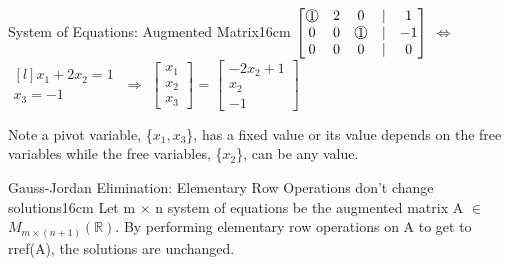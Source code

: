 \begin{definition}{System of Equations: Augmented Matrix}{16cm}
        \hspace{0.5cm}
        $\begin{bmatrix}
            \circnum{1} & 2 & 0 & | & 1 \\
            0 & 0 & \circnum{1} & | & -1 \\
            0 & 0 & 0 & | & 0
        \end{bmatrix}$
        \hspace{0.5cm}
        $\Leftrightarrow$
        \hspace{0.5cm}
        $\begin{matrix*}[l]
            x_1 + 2x_2 = 1 \\
            x_3 = -1
        \end{matrix*}$
        \hspace{0.5cm}
        $\Rightarrow$
        \hspace{0.5cm}
        $\begin{bmatrix}
            x_1 \\
            x_2 \\
            x_3
        \end{bmatrix}$ =
        $\begin{bmatrix}
            -2x_2 + 1 \\
            x_2 \\
            -1
        \end{bmatrix}$

        Note a pivot variable, \{$x_1,x_3$\}, has a fixed value
        or its value depends on the free variables while the free variables,
        \{$x_2$\}, can be any value.
    \end{definition}

    \newpage



    \begin{wtheorem}{Gauss-Jordan Elimination:
    Elementary Row Operations don't change solutions}{16cm}
        Let m $\times$ n system of equations be the
        augmented matrix A $\in$ $M_{m \times (n+1)}(\mathbb{R})$.
        By performing elementary row operations on A to get to rref(A),
        the solutions are unchanged.
    \end{wtheorem}

